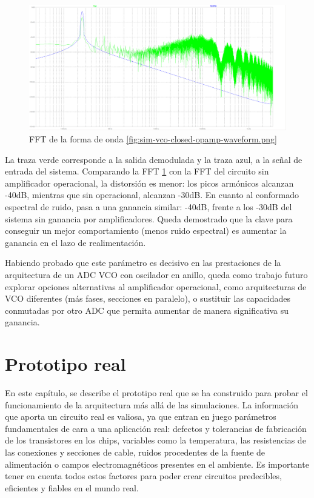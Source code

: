\documentclass[12pt]{report} %
\begin{document}
	\begin{figure}[H]
		\includegraphics[width=\textwidth]{sim-vco-closed-opamp-fft.png}
		\caption[FFT de la forma de onda \ref{fig:sim-vco-closed-opamp-waveform.png}]{FFT de la forma de onda \ref{fig:sim-vco-closed-opamp-waveform.png}}
		\label{fig:sim-vco-closed-opamp-fft.png}
	\end{figure}

	La traza verde corresponde a la salida demodulada y la traza azul, a la señal de entrada del sistema. Comparando la FFT \ref{fig:sim-vco-closed-opamp-fft.png} con la FFT del circuito sin amplificador operacional, la distorsión es menor: los picos armónicos alcanzan -40dB, mientras que sin operacional, alcanzan -30dB. En cuanto al conformado espectral de ruido, pasa a una ganancia similar: -40dB, frente a los -30dB del sistema sin ganancia por amplificadores. Queda demostrado que la clave para conseguir un mejor comportamiento (menos ruido espectral) es aumentar la ganancia en el lazo de realimentación.

	Habiendo probado que este parámetro es decisivo en las prestaciones de la arquitectura de un ADC VCO con oscilador en anillo, queda como trabajo futuro explorar opciones alternativas al amplificador operacional, como arquitecturas de VCO diferentes (más fases, secciones en paralelo), o sustituir las capacidades conmutadas por otro ADC que permita aumentar de manera significativa su ganancia.

\chapter{Prototipo real}\label{ch:prototype}

	En este capítulo, se describe el prototipo real que se ha construido para probar el funcionamiento de la arquitectura más allá de las simulaciones. La información que aporta un circuito real es valiosa, ya que entran en juego parámetros fundamentales de cara a una aplicación real: defectos y tolerancias de fabricación de los transistores en los chips, variables como la temperatura, las resistencias de las conexiones y secciones de cable, ruidos procedentes de la fuente de alimentación o campos electromagnéticos presentes en el ambiente. Es importante tener en cuenta todos estos factores para poder crear circuitos predecibles, eficientes y fiables en el mundo real.
	
\end{document}

